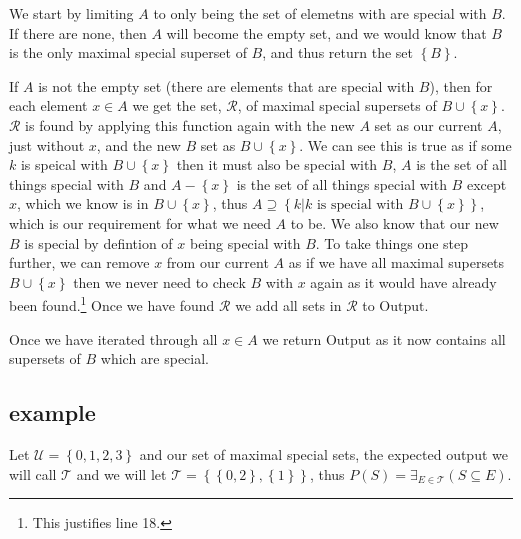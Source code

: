 \documentclass{article}
\let\union\cup
\let\setminus-
\newcommand{\set}[1]{\left\{ {#1} \right\}}
\newcommand{\setbuilder}[2]{\set{#1 | #2}}
\newcommand{\Exists}[2]{\exists_{#1}\left( {#2} \right)}
\begin{document}
We start by limiting $A$ to only being the set of elemetns with are special with $B$. If there are none, then $A$ will become the empty set, and we would know that $B$ is the only maximal special superset of $B$, and thus return the set $\set B$.

If $A$ is not the empty set (there are elements that are special with $B$), then for each element $x\in A$ we get the set, $\mathcal R$, of maximal special supersets of $B \union \set x$. $\mathcal R$ is found by applying this function again with the new $A$ set as our current $A$, just without $x$, and the new $B$ set as $B \union \set x$. We can see this is true as if some $k$ is speical with $B \union \set x$ then it must also be special with $B$, $A$ is the set of all things special with $B$ and $A \setminus \set x$ is the set of all things special with $B$ except $x$, which we know is in $B \union \set x$, thus $A\supseteq \setbuilder{k}{k \text{ is special with } B \union \set x}$, which is our requirement for what we need $A$ to be. We also know that our new $B$ is special by defintion of $x$ being special with $B$. To take things one step further, we can remove $x$ from our current $A$ as if we have all maximal supersets $B \union \set x$ then we never need to check $B$ with $x$ again as it would have already been found.\footnote{This justifies line 18.} Once we have found $\mathcal R$ we add all sets in $\mathcal R$ to $\text{Output}$.

Once we have iterated through all $x\in A$ we return $\text{Output}$ as it now contains all supersets of $B$ which are special.

\subsection{example}

Let $\mathcal U=\set{0,1,2,3}$ and our set of maximal special sets, the expected output we will call $\mathcal T$ and we will let $\mathcal T = \set{\set{0,2},\set{1}}$, thus $P(S)=\Exists{E\in\mathcal T}{S\subseteq E}$.
\end{document}

